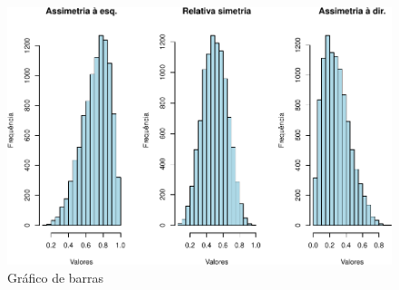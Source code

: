 \documentclass[
]{book}
\begin{document}
\begin{figure}
\centering
\includegraphics{apostila_files/figure-latex/unnamed-chunk-46-1.pdf}
\caption{\label{fig:unnamed-chunk-46}Gráfico de barras}
\end{figure}

\hfill\break
\end{document}
